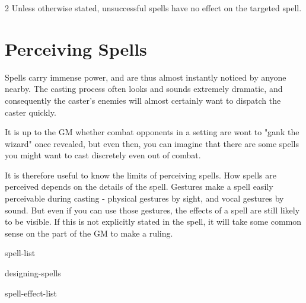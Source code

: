 \begin{multicols*}{2}
    Unless otherwise stated, unsuccessful spells have no effect on
    the targeted spell.

    \section{Perceiving Spells}
    Spells carry immense power, and are thus almost instantly noticed
    by anyone nearby. The casting process often looks and sounds
    extremely dramatic, and consequently the caster's enemies will
    almost certainly want to dispatch the caster quickly.
    
    It is up to the GM whether combat opponents in a setting are wont
    to "gank the wizard" once revealed, but even then, you can imagine
    that there are some spells you might want to cast discretely even
    out of combat.

    It is therefore useful to know the limits of perceiving spells. How
    spells are perceived depends on the details of the spell. Gestures
    make a spell easily perceivable during casting - physical gestures
    by sight, and vocal gestures by sound. But even if you can use
    those gestures, the effects of a spell are still likely to be
    visible. If this is not explicitly stated in the spell, it will
    take some common sense on the part of the GM to make a ruling.
    
    {spell-list}
    
    {designing-spells}
	
    {spell-effect-list}

\end{multicols*}
